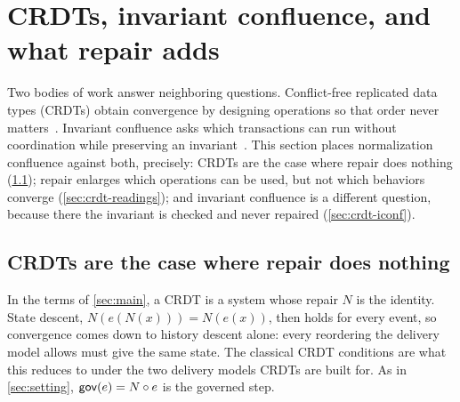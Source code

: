 
\section{CRDTs, invariant confluence, and what repair adds}\label{sec:crdt}

Two bodies of work answer neighboring questions. Conflict-free replicated data types (CRDTs)
obtain convergence by designing operations so that order never matters~\cite{shapiro2011}.
Invariant confluence asks which transactions can run without coordination while preserving an
invariant~\cite{bailis2014}. This section places normalization confluence against both, precisely:
CRDTs are the case where repair does nothing (\cref{sec:crdt-identity}); repair enlarges which
operations can be used, but not which behaviors converge (\cref{sec:crdt-readings}); and invariant
confluence is a different question, because there the invariant is checked and never repaired
(\cref{sec:crdt-iconf}).

\subsection{CRDTs are the case where repair does nothing}\label{sec:crdt-identity}

In the terms of \cref{sec:main}, a CRDT is a system whose repair $N$ is the identity. State descent,
$N(e(N(x))) = N(e(x))$, then holds for every event, so convergence comes down to history descent
alone: every reordering the delivery model allows must give the same state. The classical CRDT
conditions are what this reduces to under the two delivery models CRDTs are built for. As in
\cref{sec:setting}, $\mathsf{gov}(e) = N \circ e$ is the governed step.

